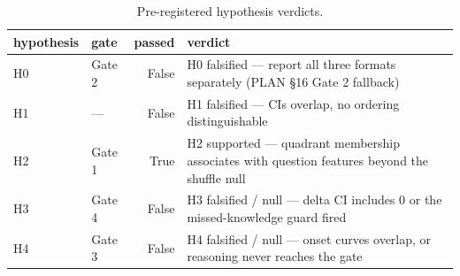 \begin{table}
\caption{Pre-registered hypothesis verdicts.}
\label{tab:t15_hypothesis_verdicts}
\begin{tabular}{llrl}
\toprule
hypothesis & gate & passed & verdict \\
\midrule
H0 & Gate 2 & False & H0 falsified — report all three formats separately (PLAN §16 Gate 2 fallback) \\
H1 & — & False & H1 falsified — CIs overlap, no ordering distinguishable \\
H2 & Gate 1 & True & H2 supported — quadrant membership associates with question features beyond the shuffle null \\
H3 & Gate 4 & False & H3 falsified / null — delta CI includes 0 or the missed-knowledge guard fired \\
H4 & Gate 3 & False & H4 falsified / null — onset curves overlap, or reasoning never reaches the gate \\
\bottomrule
\end{tabular}
\end{table}
